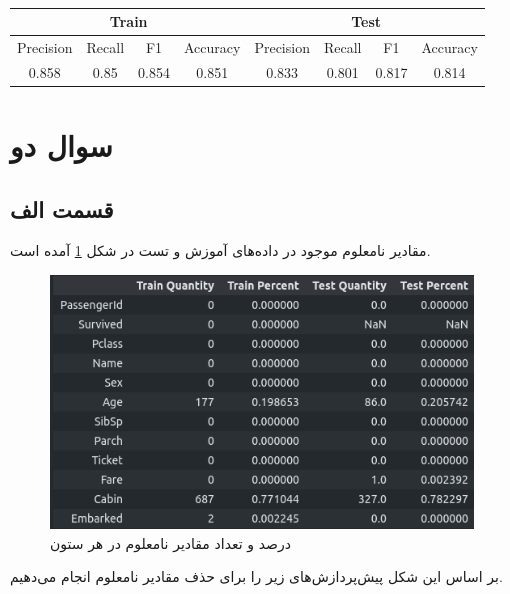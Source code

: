 \documentclass{article}
\begin{document}
\begin{latin}
\begin{table}[h]
    \centering
    \caption{}
    \begin{tabular}{c|c|c|c|c|c|c|c}
        \multicolumn{4}{c|}{Train} & \multicolumn{4}{|c}{Test} \\
        \hline
        Precision & Recall & F1 & Accuracy & Precision & Recall & F1 & Accuracy \\
        \hline
        0.858 & 0.85 & 0.854 & 0.851 & 0.833 & 0.801 & 0.817 & 0.814
    \end{tabular}
    \label{implementation-q1-partc-oldpeak-metrics}
\end{table}
\end{latin}

\section*{سوال دو}

\subsection*{قسمت الف}

مقادیر نامعلوم  موجود در داده‌های آموزش و تست در شکل \ref{q2-missing-values} آمده است.

\begin{figure}[h]
    \centering
    \includegraphics[scale=0.3]{images/implementation/q2/missing_values.png}
    \caption{درصد و تعداد مقادیر نامعلوم در هر ستون}
    \label{q2-missing-values}
\end{figure}

بر اساس این شکل پیش‌پردازش‌های زیر را برای حذف مقادیر نامعلوم انجام می‌دهیم.
\end{document}
